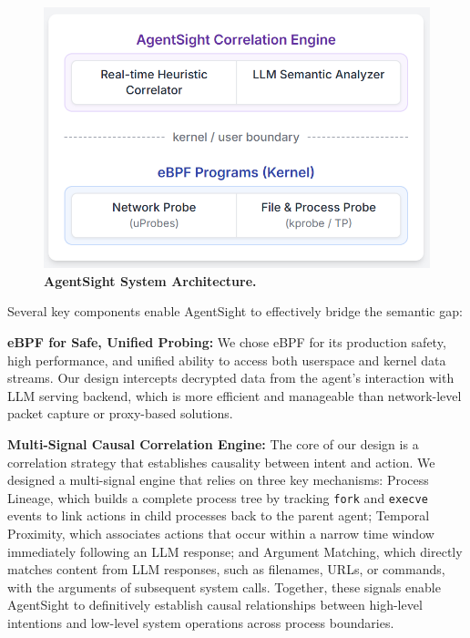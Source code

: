 \begin{figure}[h!]
    \centering
    \includegraphics[width=\columnwidth]{figture/arch.png} %
    \caption{\textbf{AgentSight System Architecture.}}
    \label{fig:architecture}
\end{figure}

Several key components enable AgentSight to effectively bridge the semantic gap:

\textbf{eBPF for Safe, Unified Probing:} We chose eBPF for its production safety, high performance, and unified ability to access both userspace and kernel data streams. Our design intercepts decrypted data from the agent's interaction with LLM serving backend, which is more efficient and manageable than network-level packet capture or proxy-based solutions.

\textbf{Multi-Signal Causal Correlation Engine:} The core of our design is a correlation strategy that establishes causality between intent and action. We designed a multi-signal engine that relies on three key mechanisms: Process Lineage, which builds a complete process tree by tracking \texttt{fork} and \texttt{execve} events to link actions in child processes back to the parent agent; Temporal Proximity, which associates actions that occur within a narrow time window immediately following an LLM response; and Argument Matching, which directly matches content from LLM responses, such as filenames, URLs, or commands, with the arguments of subsequent system calls. Together, these signals enable AgentSight to definitively establish causal relationships between high-level intentions and low-level system operations across process boundaries.

